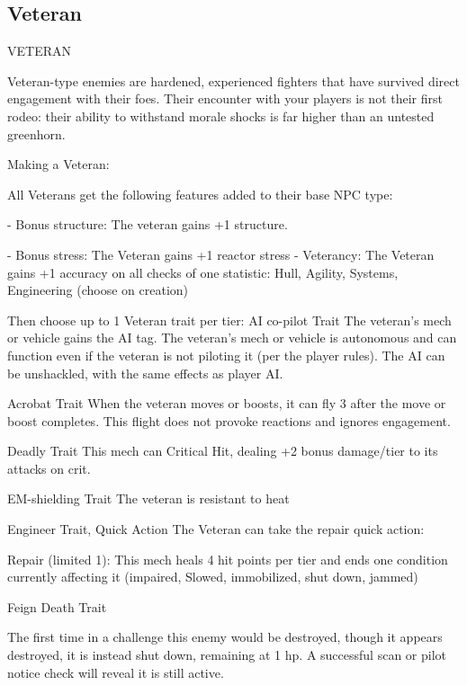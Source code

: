 \subsection{Veteran}
                                                   VETERAN  

Veteran-type enemies are hardened, experienced fighters that have survived direct engagement  
with their foes. Their encounter with your players is not their first rodeo: their ability to withstand  
morale shocks is far higher than an untested greenhorn.
 

Making a Veteran:
 
All Veterans get the following features added to their base NPC type:
 
     -   Bonus structure: The veteran gains +1 structure.
 
     -   Bonus stress: The Veteran gains +1 reactor stress  
     -   Veterancy: The Veteran gains +1 accuracy on all checks of one statistic: Hull, Agility,  
         Systems, Engineering (choose on creation)  

Then choose up to 1 Veteran trait per tier:  
AI co-pilot  
Trait  
The veteran’s mech or vehicle gains the AI tag. The veteran’s mech or vehicle is autonomous and  
can function even if the veteran is not piloting it (per the player rules). The AI can be unshackled,  
with the same effects as player AI.
 

Acrobat  
Trait  
When the veteran moves or boosts, it can fly 3 after the move or boost completes. This flight  
does not provoke reactions and ignores engagement.
 

Deadly  
Trait  
This mech can Critical Hit, dealing +2 bonus damage/tier to its attacks on crit.
 

EM-shielding  
Trait  
The veteran is resistant to heat
 

Engineer  
Trait, Quick Action  
The Veteran can take the repair quick action:
 
         Repair (limited 1): This mech heals 4 hit points per tier and ends one condition currently  
         affecting it (impaired, Slowed, immobilized, shut down, jammed)
 

Feign Death  
Trait  

                                                                                                                  


The first time in a challenge this enemy would be destroyed, though it appears destroyed, it is  
instead shut down, remaining at 1 hp. A successful scan or pilot notice check will reveal it is still  
active.
 

